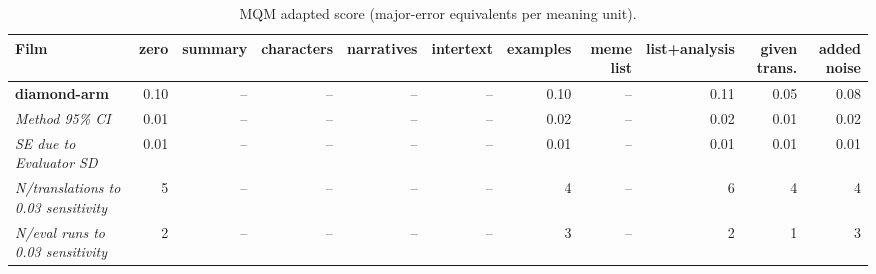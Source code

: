 \begin{table}[ht]
\centering
\begin{adjustbox}{width=\textwidth}
\begin{tabular}{lrrrrrrrrr|r}
Film & zero & summary & characters & narratives & intertext & examples & meme list & list+analysis & given trans. & added noise \\
\hline
\textbf{diamond-arm} & 0.10 & -- & -- & -- & -- & 0.10 & -- & 0.11 & 0.05 & 0.08 \\

\emph{Method 95\% CI} & 0.01 & -- & -- & -- & -- & 0.02 & -- & 0.02 & 0.01 & 0.02 \\

\emph{SE due to Evaluator SD} & 0.01 & -- & -- & -- & -- & 0.01 & -- & 0.01 & 0.01 & 0.01 \\

\emph{N/translations to 0.03 sensitivity} & 5 & -- & -- & -- & -- & 4 & -- & 6 & 4 & 4 \\

\emph{N/eval runs to 0.03 sensitivity} & 2 & -- & -- & -- & -- & 3 & -- & 2 & 1 & 3 \\

\hline
\end{tabular}
\end{adjustbox}
\caption{MQM adapted score (major-error equivalents per meaning unit).}
\label{tab:mqm-method-comparison}
\end{table}
